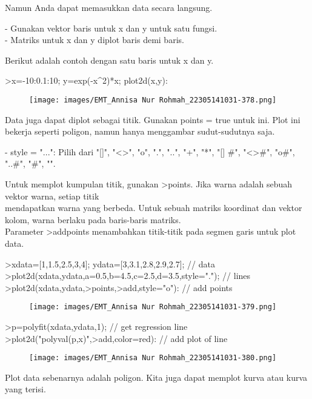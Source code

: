 \documentclass[a4paper,10pt]{article}
\begin{document}
\begin{eulernotebook}
\begin{eulercomment}
Namun Anda dapat memasukkan data secara langsung.

- Gunakan vektor baris untuk x dan y untuk satu fungsi.\\
- Matriks untuk x dan y diplot baris demi baris.

Berikut adalah contoh dengan satu baris untuk x dan y.
\end{eulercomment}
\begin{eulerprompt}
>x=-10:0.1:10; y=exp(-x^2)*x; plot2d(x,y):
\end{eulerprompt}
\begin{figure}[h]
    \centering
    \texttt{[image: images/EMT\_Annisa Nur Rohmah\_22305141031-378.png]}
\end{figure}
\begin{eulercomment}
Data juga dapat diplot sebagai titik. Gunakan points = true untuk ini.
Plot ini bekerja seperti poligon, namun hanya menggambar
sudut-sudutnya saja.

- style = "...": Pilih dari "[]", "\textless{}\textgreater{}", "o", ".", "..", "+", "*", "[]
#", "\textless{}\textgreater{}#", "o#", "..#", "#", "\textbar{}".

Untuk memplot kumpulan titik, gunakan \textgreater{}points. Jika warna adalah
sebuah vektor warna, setiap titik\\
mendapatkan warna yang berbeda. Untuk sebuah matriks koordinat dan
vektor kolom, warna berlaku pada baris-baris matriks.\\
Parameter \textgreater{}addpoints menambahkan titik-titik pada segmen garis untuk
plot data.
\end{eulercomment}
\begin{eulerprompt}
>xdata=[1,1.5,2.5,3,4]; ydata=[3,3.1,2.8,2.9,2.7]; // data
>plot2d(xdata,ydata,a=0.5,b=4.5,c=2.5,d=3.5,style="."); // lines
>plot2d(xdata,ydata,>points,>add,style="o"): // add points
\end{eulerprompt}
\begin{figure}[h]
    \centering
    \texttt{[image: images/EMT\_Annisa Nur Rohmah\_22305141031-379.png]}
\end{figure}
\begin{eulerprompt}
>p=polyfit(xdata,ydata,1); // get regression line
>plot2d("polyval(p,x)",>add,color=red): // add plot of line
\end{eulerprompt}
\begin{figure}[h]
    \centering
    \texttt{[image: images/EMT\_Annisa Nur Rohmah\_22305141031-380.png]}
\end{figure}
\begin{eulercomment}
Plot data sebenarnya adalah poligon. Kita juga dapat memplot kurva
atau kurva yang terisi.


\end{eulercomment}
\end{eulernotebook}
\end{document}
